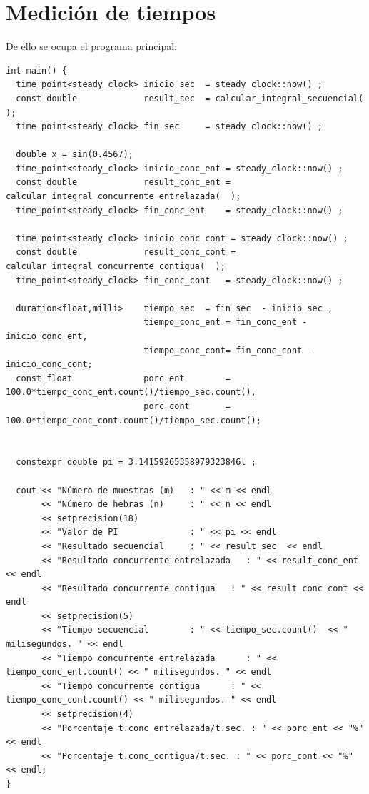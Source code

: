 \documentclass[12pt]{article}
\begin{document}
\section{Medición de tiempos}
De ello se ocupa el programa principal: 
\begin{lstlisting}
int main() {
  time_point<steady_clock> inicio_sec  = steady_clock::now() ;
  const double             result_sec  = calcular_integral_secuencial(  );
  time_point<steady_clock> fin_sec     = steady_clock::now() ;

  double x = sin(0.4567);
  time_point<steady_clock> inicio_conc_ent = steady_clock::now() ;
  const double             result_conc_ent = calcular_integral_concurrente_entrelazada(  );
  time_point<steady_clock> fin_conc_ent    = steady_clock::now() ;

  time_point<steady_clock> inicio_conc_cont = steady_clock::now() ;
  const double             result_conc_cont = calcular_integral_concurrente_contigua(  );
  time_point<steady_clock> fin_conc_cont   = steady_clock::now() ;

  duration<float,milli>    tiempo_sec  = fin_sec  - inicio_sec ,
                           tiempo_conc_ent = fin_conc_ent - inicio_conc_ent,
                           tiempo_conc_cont= fin_conc_cont - inicio_conc_cont;
  const float              porc_ent        = 100.0*tiempo_conc_ent.count()/tiempo_sec.count(),
                           porc_cont       = 100.0*tiempo_conc_cont.count()/tiempo_sec.count();


  constexpr double pi = 3.14159265358979323846l ;

  cout << "Número de muestras (m)   : " << m << endl
       << "Número de hebras (n)     : " << n << endl
       << setprecision(18)
       << "Valor de PI              : " << pi << endl
       << "Resultado secuencial     : " << result_sec  << endl
       << "Resultado concurrente entrelazada   : " << result_conc_ent << endl
       << "Resultado concurrente contigua   : " << result_conc_cont << endl
       << setprecision(5)
       << "Tiempo secuencial        : " << tiempo_sec.count()  << " milisegundos. " << endl
       << "Tiempo concurrente entrelazada      : " << tiempo_conc_ent.count() << " milisegundos. " << endl
       << "Tiempo concurrente contigua      : " << tiempo_conc_cont.count() << " milisegundos. " << endl
       << setprecision(4)
       << "Porcentaje t.conc_entrelazada/t.sec. : " << porc_ent << "%" << endl
       << "Porcentaje t.conc_contigua/t.sec. : " << porc_cont << "%" << endl;
}

\end{lstlisting}
\end{document}

